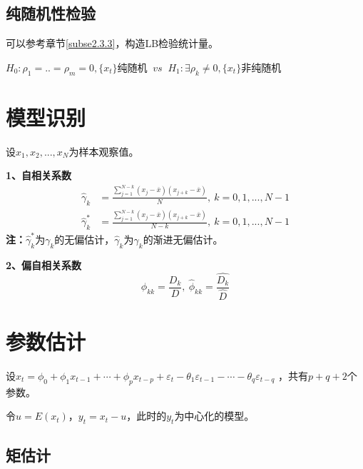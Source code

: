 \documentclass[12pt, a4paper, oneside]{ctexbook}
\begin{document}
\subsection{纯随机性检验}
可以参考章节\ref{subse2.3.3}，构造LB检验统计量。
\begin{center}
    $H_0:\rho_1=..=\rho_m=0,\{x_t\}$纯随机 $~vs~$ $H_1:\exists \rho_k \neq 0,\{x_t\}$非纯随机
\end{center}



\section{模型识别}
设$x_1,x_2,...,x_N$为样本观察值。

\textbf{1、自相关系数}
\begin{equation}
    \begin{aligned}
        \hat{\gamma}_k   & = \frac{\sum_{j = 1}^{N-k}(x_j - \overline{x})(x_{j+k} - \overline{x})}
        {N},~k = 0,1,...,N-1                                                                       \\
        \hat{\gamma}_k^* & = \frac{\sum_{j = 1}^{N-k}(x_j - \overline{x})(x_{j+k} - \overline{x})}
        {N-k},~k = 0,1,...,N-1
    \end{aligned}
\end{equation}
\textbf{注：}$\hat{\gamma}_k^*$为$\gamma_k$的无偏估计，$\hat{\gamma}_k$为$\gamma_k$的渐进无偏估计。

\textbf{2、偏自相关系数}
\begin{equation}
    \phi_{kk} = \frac{D_k}{D},~\hat{\phi}_{kk} = \frac{\hat{D_k}}{\hat{D}}
\end{equation}

\section{参数估计}
设$x_t=\phi_0+\phi_1x_{t-1}+\cdots+\phi_px_{t-p}+\varepsilon_t-\theta_1\varepsilon_{t-1}-\cdots-\theta_q\varepsilon_{t-q}$
，共有$p+q+2$个参数。

令$u = E(x_t)$，$y_t = x_t - u$，此时的$y_t$为中心化的模型。
\subsection{矩估计}
\end{document}

